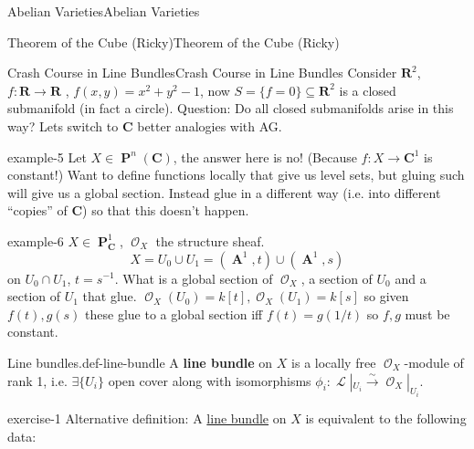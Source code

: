 \documentclass[10pt,]{book}
\newcommand{\terminology}[1]{\textbf{#1}}
\numberwithin{equation}{section}
\newcommand{\sheaf}[1]{\operatorname{\mathcal{#1}}}
\newcommand{\RR}{\mathbf{R}}
\newcommand{\CC}{\mathbf{C}}
\DeclareMathOperator{\aff}{\mathbf{A}}
\DeclareMathOperator{\PP}{\mathbf{P}}
\begin{document}
\begin{chapterptx}{Abelian Varieties}{}{Abelian Varieties}{}{}
\typeout{************************************************}
%
\begin{sectionptx}{Theorem of the Cube (Ricky)}{}{Theorem of the Cube (Ricky)}{}{}\label{sec-thm-cube}
%
%
\typeout{************************************************}
\typeout{************************************************}
%
\begin{subsectionptx}{Crash Course in Line Bundles}{}{Crash Course in Line Bundles}{}{}\label{sec-crash-course-line-bundles}
\hypertarget{p-107}{}%
Consider \(\RR^2\), \(f\colon \RR \to \RR\) , \(f(x,y) = x^2 + y^2 -1\), now \(S = \{f=0\}\subseteq \RR^2\) is a closed submanifold (in fact a circle). Question: Do all closed submanifolds arise in this way? Lets switch to \(\CC\) better analogies with AG.%
\begin{example}{}{example-5}%
\hypertarget{p-108}{}%
Let \(X\in \PP^n(\CC)\), the answer here is no! (Because \(f\colon X \to \CC^1\) is constant!) Want to define functions locally that give us level sets, but gluing such will give us a global section. Instead glue in a different way (i.e. into different ``copies'' of \(\CC\)) so that this doesn't happen.%
\end{example}
\begin{example}{}{example-6}%
\hypertarget{p-109}{}%
\(X\in \PP_\CC^1\), \(\sheaf O_X\) the structure sheaf.%
\begin{equation*}
X = U_0 \cup U_1 = (\aff^1,t) \cup(\aff^1,s)
\end{equation*}
on \(U_0\cap U_1\), \(t = s^{-1}\). What is a global section of \(\sheaf O_X\), a section of \(U_0\) and a section of \(U_1\) that glue. \(\sheaf O_X(U_0) =  k[t], \sheaf O_X(U_1) =  k[s]\) so given \(f(t), g(s)\) these glue to a global section iff \(f(t) = g(1/t)\) so \(f,g\) must be constant.%
\end{example}
\begin{definition}{Line bundles.}{def-line-bundle}%
\hypertarget{p-110}{}%
A \terminology{line bundle} on \(X\) is a locally free \(\sheaf O_X\)-module of rank 1, i.e. \(\exists \{U_i\}\) open cover along with isomorphisms \(\phi_i\colon \sheaf L|_{U_i} \xrightarrow\sim \sheaf O_X |_{U_i}\).%
\end{definition}
\begin{inlineexercise}{}{exercise-1}%
\hypertarget{p-111}{}%
Alternative definition: A \hyperref[def-line-bundle]{line bundle} on \(X\) is equivalent to the following data:\leavevmode%

\end{inlineexercise}
\end{subsectionptx}
\end{sectionptx}
\end{chapterptx}
\end{document}
